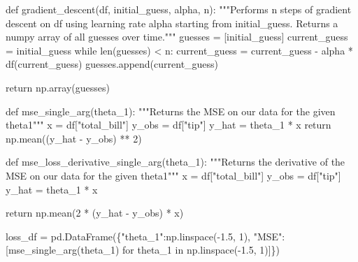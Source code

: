 \documentclass[
  letterpaper,
  DIV=11,
  numbers=noendperiod]{scrreprt}
\newenvironment{Shaded}{\begin{snugshade}}{\end{snugshade}}
\newcommand{\BuiltInTok}[1]{\textcolor[rgb]{0.00,0.23,0.31}{#1}}
\newcommand{\CommentTok}[1]{\textcolor[rgb]{0.37,0.37,0.37}{#1}}
\newcommand{\ControlFlowTok}[1]{\textcolor[rgb]{0.00,0.23,0.31}{#1}}
\newcommand{\DecValTok}[1]{\textcolor[rgb]{0.68,0.00,0.00}{#1}}
\newcommand{\FloatTok}[1]{\textcolor[rgb]{0.68,0.00,0.00}{#1}}
\newcommand{\KeywordTok}[1]{\textcolor[rgb]{0.00,0.23,0.31}{#1}}
\newcommand{\NormalTok}[1]{\textcolor[rgb]{0.00,0.23,0.31}{#1}}
\newcommand{\OperatorTok}[1]{\textcolor[rgb]{0.37,0.37,0.37}{#1}}
\newcommand{\StringTok}[1]{\textcolor[rgb]{0.13,0.47,0.30}{#1}}
\begin{document}
\begin{Shaded}
\begin{Highlighting}[]
\KeywordTok{def}\NormalTok{ gradient\_descent(df, initial\_guess, alpha, n):}
    \CommentTok{"""Performs n steps of gradient descent on df using learning rate alpha starting}
\CommentTok{       from initial\_guess. Returns a numpy array of all guesses over time."""}
\NormalTok{    guesses }\OperatorTok{=}\NormalTok{ [initial\_guess]}
\NormalTok{    current\_guess }\OperatorTok{=}\NormalTok{ initial\_guess}
    \ControlFlowTok{while} \BuiltInTok{len}\NormalTok{(guesses) }\OperatorTok{\textless{}}\NormalTok{ n:}
\NormalTok{        current\_guess }\OperatorTok{=}\NormalTok{ current\_guess }\OperatorTok{{-}}\NormalTok{ alpha }\OperatorTok{*}\NormalTok{ df(current\_guess)}
\NormalTok{        guesses.append(current\_guess)}
        
    \ControlFlowTok{return}\NormalTok{ np.array(guesses)}

\KeywordTok{def}\NormalTok{ mse\_single\_arg(theta\_1):}
    \CommentTok{"""Returns the MSE on our data for the given theta1"""}
\NormalTok{    x }\OperatorTok{=}\NormalTok{ df[}\StringTok{"total\_bill"}\NormalTok{]}
\NormalTok{    y\_obs }\OperatorTok{=}\NormalTok{ df[}\StringTok{"tip"}\NormalTok{]}
\NormalTok{    y\_hat }\OperatorTok{=}\NormalTok{ theta\_1 }\OperatorTok{*}\NormalTok{ x}
    \ControlFlowTok{return}\NormalTok{ np.mean((y\_hat }\OperatorTok{{-}}\NormalTok{ y\_obs) }\OperatorTok{**} \DecValTok{2}\NormalTok{)}

\KeywordTok{def}\NormalTok{ mse\_loss\_derivative\_single\_arg(theta\_1):}
    \CommentTok{"""Returns the derivative of the MSE on our data for the given theta1"""}
\NormalTok{    x }\OperatorTok{=}\NormalTok{ df[}\StringTok{"total\_bill"}\NormalTok{]}
\NormalTok{    y\_obs }\OperatorTok{=}\NormalTok{ df[}\StringTok{"tip"}\NormalTok{]}
\NormalTok{    y\_hat }\OperatorTok{=}\NormalTok{ theta\_1 }\OperatorTok{*}\NormalTok{ x}
    
    \ControlFlowTok{return}\NormalTok{ np.mean(}\DecValTok{2} \OperatorTok{*}\NormalTok{ (y\_hat }\OperatorTok{{-}}\NormalTok{ y\_obs) }\OperatorTok{*}\NormalTok{ x)}

\NormalTok{loss\_df }\OperatorTok{=}\NormalTok{ pd.DataFrame(\{}\StringTok{"theta\_1"}\NormalTok{:np.linspace(}\OperatorTok{{-}}\FloatTok{1.5}\NormalTok{, }\DecValTok{1}\NormalTok{), }\StringTok{"MSE"}\NormalTok{:[mse\_single\_arg(theta\_1) }\ControlFlowTok{for}\NormalTok{ theta\_1 }\KeywordTok{in}\NormalTok{ np.linspace(}\OperatorTok{{-}}\FloatTok{1.5}\NormalTok{, }\DecValTok{1}\NormalTok{)]\})}


\end{Highlighting}
\end{Shaded}
\end{document}
